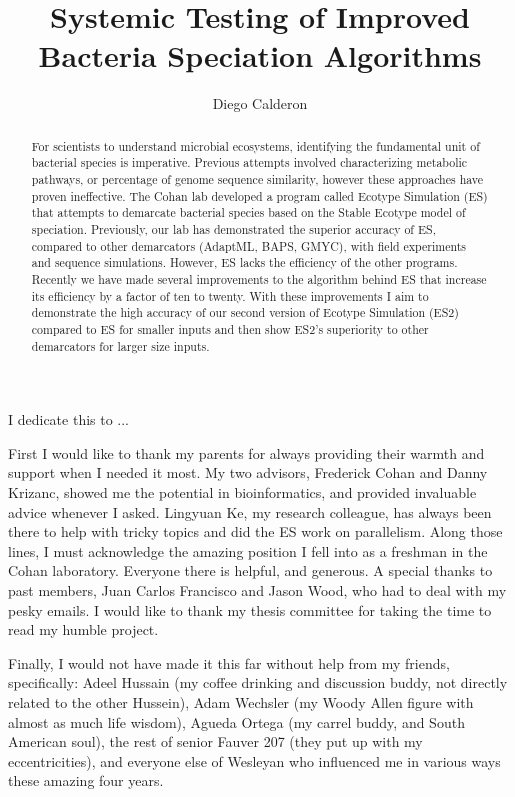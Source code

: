 \documentclass[11pt, final]{westhesis}
\title{Systemic Testing of Improved Bacteria Speciation Algorithms}
\author{Diego Calderon}
\begin{document}

\begin{dedication}
I dedicate this to ...
\end{dedication}

\begin{acknowledgements}
First I would like to thank my parents for always providing their warmth and support when I needed it most.
My two advisors, Frederick Cohan and Danny Krizanc, showed me the potential in bioinformatics, and provided invaluable advice whenever I asked.
Lingyuan Ke, my research colleague, has always been there to help with tricky topics and did the ES work on parallelism.
Along those lines, I must acknowledge the amazing position I fell into as a freshman in the Cohan laboratory.
Everyone there is helpful, and generous.
A special thanks to past members, Juan Carlos Francisco and Jason Wood, who had to deal with my pesky emails.
I would like to thank my thesis committee for taking the time to read my humble project.

Finally, I would not have made it this far without help from my friends, specifically: Adeel Hussain (my coffee drinking and discussion buddy, not directly related to the other Hussein), Adam Wechsler (my Woody Allen figure with almost as much life wisdom), Agueda Ortega (my carrel buddy,  and South American soul), the rest of senior Fauver 207 (they put up with my eccentricities), and everyone else of Wesleyan who influenced me in various ways these amazing four years.
\end{acknowledgements}


\begin{abstract}
For scientists to understand microbial ecosystems, identifying the fundamental unit of bacterial species is imperative.
Previous attempts involved characterizing metabolic pathways, or percentage of genome sequence similarity, however these approaches have proven ineffective.
The Cohan lab developed a program called Ecotype Simulation (ES) that attempts to demarcate bacterial species based on the Stable Ecotype model of speciation.
Previously, our lab has demonstrated the superior accuracy of ES, compared to other demarcators (AdaptML, BAPS, GMYC), with field experiments and sequence simulations.
However, ES lacks the efficiency of the other programs.
Recently we have made several improvements to the algorithm behind ES that increase its efficiency by a factor of ten to twenty.
With these improvements I aim to demonstrate the high accuracy of our second version of Ecotype Simulation (ES2) compared to ES for smaller inputs and then show ES2's superiority to other demarcators for larger size inputs.
\end{abstract}
\end{document}
